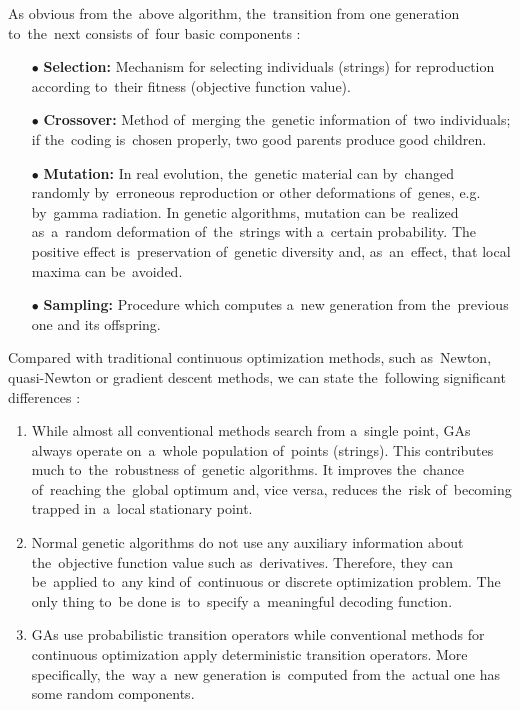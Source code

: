 As obvious from the~above algorithm, the~transition from one generation to~the~next consists of~four basic components \cite{mitchell1998introduction}:

\begin{itemize}
  \item[$\bullet$] \textbf{Selection:} Mechanism for selecting individuals (strings) for reproduction according to~their fitness (objective function value).
  \item[$\bullet$] \textbf{Crossover:} Method of~merging the~genetic information of~two individuals; if the~coding is~chosen properly, two good parents produce good children.
  \item[$\bullet$] \textbf{Mutation:} In real evolution, the~genetic material can by~changed randomly by~erroneous reproduction or other deformations of~genes, e.g. by~gamma radiation. In genetic algorithms, mutation can be~realized as~a~random deformation of~the~strings with a~certain probability. The positive effect is~preservation of~genetic diversity and, as~an~effect, that local maxima can be~avoided.
  \item[$\bullet$] \textbf{Sampling:} Procedure which computes a~new generation from the~previous one and its offspring.
\end{itemize}

Compared with traditional continuous optimization methods, such as~Newton, quasi-Newton or gradient descent methods, we can state the~following significant differences \cite{fletcher2013practical}:

\begin{enumerate}
  \item While almost all conventional methods search from a~single point, GAs always operate on~a~whole population of~points (strings). This contributes much to~the~robustness of~genetic algorithms. It improves the~chance of~reaching the~global optimum and, vice versa, reduces the~risk of~becoming trapped in~a~local stationary point.
  \item Normal genetic algorithms do not use any auxiliary information about the~objective function value such as~derivatives. Therefore, they can be~applied to~any kind of~continuous or discrete optimization problem. The only thing to~be done is~to~specify a~meaningful decoding function. 
  \item GAs use probabilistic transition operators while conventional methods for continuous optimization apply deterministic transition operators. More specifically, the~way a~new generation is~computed from the~actual one has some random components.
\end{enumerate}

